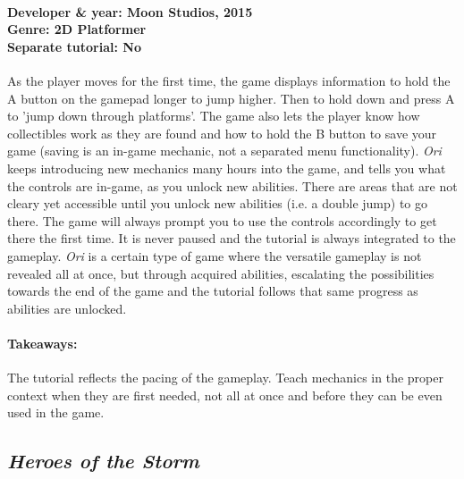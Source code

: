 \paragraph{Developer \& year: Moon Studios, 2015 \\ Genre: 2D Platformer \\ Separate tutorial: No \\}
As the player moves for the first time, the game displays information to hold the A button on the gamepad longer to jump higher.
Then to hold down and press A to 'jump down through platforms'.
The game also lets the player know how collectibles work as they are found and how to hold the B button  to save your game (saving is an in-game mechanic, not a separated menu functionality).
\textit{Ori} keeps introducing new mechanics many hours into the game, and tells you what the controls are in-game, as you unlock new abilities.
There are areas that are not cleary yet accessible until you unlock new abilities (i.e. a double jump) to go there. The game will always prompt you to use the controls accordingly to get there the first time. It is never paused and the tutorial is always integrated to the gameplay.
\textit{Ori} is a certain type of game where the versatile gameplay is not revealed all at once, but through acquired abilities, escalating the possibilities towards the end of the game and the tutorial follows that same progress as abilities are unlocked.
\paragraph{Takeaways:}
The tutorial reflects the pacing of the gameplay. Teach mechanics in the proper context when they are first needed, not all at once and before they can be even used in the game.

\subsection{\textit{Heroes of the Storm}}
